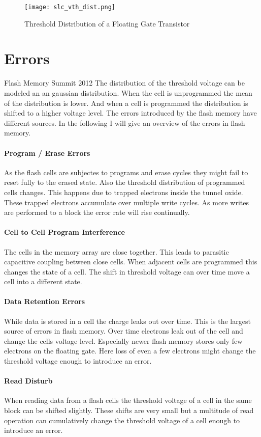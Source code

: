 \begin{figure}
    \texttt{[image: slc\_vth\_dist.png]}
    \centering
    \caption{Threshold Distribution of a Floating Gate Transistor\cite{RiTo98}}
    \label{nand_th}
\end{figure}

\section{Errors}Flash Memory Summit 2012
The distribution of the threshold voltage can be modeled an an gaussian distribution\cite{ZaTu16}. When the cell is unprogrammed the mean of the distribution is lower. And when a cell is programmed the distribution is shifted to a higher voltage level. The errors introduced by the flash memory have different sources. In the following I will give an overview of the errors in flash memory.
\paragraph{Program / Erase Errors}
As the flash cells are subjectes to programs and erase cycles they might fail to reset fully to the erased state. Also the threshold distribution of programmed cells changes. This happens due to trapped electrons inside the tunnel oxide. These trapped electrons accumulate over multiple write cycles. As more writes are performed to a block the error rate will rise continually.
\paragraph{Cell to Cell Program Interference}
The cells in the memory array are close together. This leads to parasitic capacitive coupling between close cells. When adjacent cells are programmed this changes the state of a cell. The shift in threshold voltage can over time move a cell into a different state.
\paragraph{Data Retention Errors}
While data is stored in a cell the charge leaks out over time. This is the largest source of errors in flash memory. Over time electrons leak out of the cell and change the cells voltage level. Especially newer flash memory stores only few electrons on the floating gate. Here loss of even a few electrons might change the threshold voltage enough to introduce an error\cite{YoGa12}.
\paragraph{Read Disturb}
When reading data from a flash cells the threshold voltage of a cell in the same block can be shifted slightly. These shifts are very small but a multitude of read operation can cumulatively change the threshold voltage of a cell enough to introduce an error.
\cite{CaGh17}